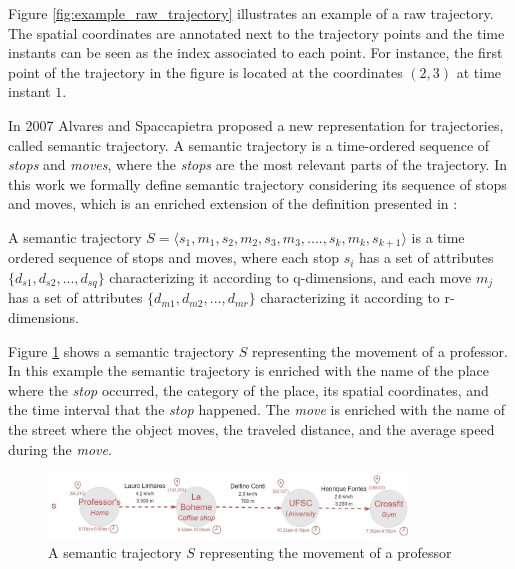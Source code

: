 Figure \ref{fig:example_raw_trajectory} illustrates an example of a raw trajectory. The spatial coordinates are annotated next to the trajectory points and the time instants can be seen as the index associated to each point. For instance, the first point of the trajectory in the figure is located at the coordinates $(2,3)$ at time instant $1$.

In 2007 Alvares \cite{alvares2007model} and Spaccapietra \cite{Spaccapietra:2008:CVT:1347466.1347785} proposed a new representation for trajectories, called semantic trajectory. A semantic trajectory is a time-ordered sequence of \emph{stops} and \emph{moves}, where the \emph{stops} are the most relevant parts of the trajectory.
In this work we formally define semantic trajectory considering its sequence of stops and moves, which is an enriched extension of the definition presented in \cite{Spaccapietra:2008:CVT:1347466.1347785}:

\begin{definition}
\label{def:semantic_trajectory}
A semantic trajectory  \break
$S=\langle s_1, m_1, s_2, m_2, s_3,m_3, ...., s_k, m_k, s_{k+1} \rangle$ is a time ordered sequence of stops and moves, where each stop $s_i$ has a set of attributes $\{d_{s1}, d_{s2}, ...,d_{sq}\}$ characterizing it according to q-dimensions, and each move $m_j$  has a set of attributes $\{d_{m1}, d_{m2}, ...,d_{mr}\}$ characterizing it according to r-dimensions. 
\end{definition}

Figure \ref{fig:related_semantic_trajes} shows a semantic trajectory $S$ representing the movement of a professor. In this example the semantic trajectory is enriched with the name of the place where the \emph{stop} occurred, the category of the place, its spatial coordinates, and the time interval that the \emph{stop} happened. The \emph{move} is enriched with the name of the street where the object moves, the traveled distance, and the average speed during the \emph{move}.

\begin{figure}[h]
\centering
\includegraphics[width=0.85\textwidth]{Related_Works/Single_Semantic_trajectorie.jpg}
\caption{\label{fig:related_semantic_trajes}A semantic trajectory $S$ representing the movement of a professor}
\end{figure}

